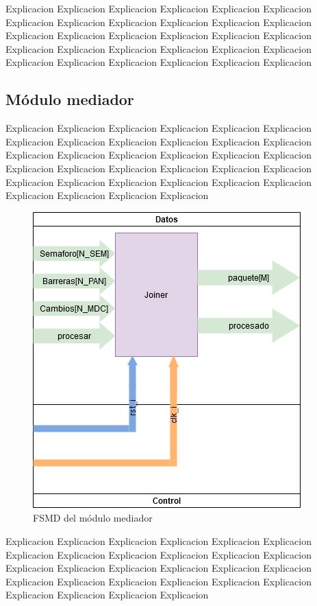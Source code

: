 		Explicacion Explicacion Explicacion Explicacion Explicacion Explicacion Explicacion Explicacion Explicacion Explicacion Explicacion Explicacion Explicacion Explicacion Explicacion Explicacion Explicacion Explicacion Explicacion Explicacion Explicacion Explicacion Explicacion Explicacion Explicacion Explicacion Explicacion Explicacion Explicacion Explicacion 
		
	\subsection{Módulo mediador}
	
		Explicacion Explicacion Explicacion Explicacion Explicacion Explicacion Explicacion Explicacion Explicacion Explicacion Explicacion Explicacion Explicacion Explicacion Explicacion Explicacion Explicacion Explicacion Explicacion Explicacion Explicacion Explicacion Explicacion Explicacion Explicacion Explicacion Explicacion Explicacion Explicacion Explicacion Explicacion Explicacion Explicacion Explicacion 
		
		\begin{figure}[h]
		\centering
			\includegraphics[scale=.5]{./Figures/FSMD-Mediador}
			\caption{FSMD del módulo mediador}
			\label{fig:FSMD_Mediador}
		\end{figure}
		
		Explicacion Explicacion Explicacion Explicacion Explicacion Explicacion Explicacion Explicacion Explicacion Explicacion Explicacion Explicacion Explicacion Explicacion Explicacion Explicacion Explicacion Explicacion Explicacion Explicacion Explicacion Explicacion Explicacion Explicacion Explicacion Explicacion Explicacion Explicacion 
		
